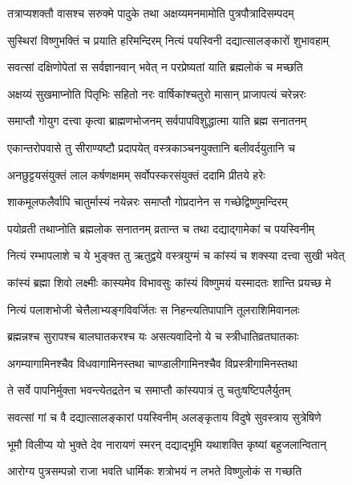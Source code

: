 \twolineshloka
{तत्राप्यशक्तौ वासश्च सरुक्मे पादुके तथा}
{अक्षय्यमनमामोति पुत्रपौत्रादिसम्पदम्} %

\twolineshloka
{सुस्थिरां विष्णुभक्तिं च प्रयाति हरिमन्दिरम्}
{नित्यं पयस्विनी दद्यात्सालङ्कारों शुभावहाम्} %

\twolineshloka
{सवत्सां दक्षिणोपेतां स सर्वज्ञानवान् भवेत्}
{न परप्रेष्यतां याति ब्रह्मलोकं च मच्छति} %

\twolineshloka
{अक्षय्यं सुखमाप्नोति पितृभिः सहितो नरः}
{वार्षिकांश्चतुरो मासान् प्राजापत्यं चरेन्नरः} %

\twolineshloka
{समाप्तौ गोयुग दत्त्वा कृत्वा ब्राह्मणभोजनम्}
{सर्वपापविशुद्धात्मा याति ब्रह्म सनातनम्} %

\twolineshloka
{एकान्तरोपवासे तु सीराण्यष्टौ प्रदापयेत्}
{वस्त्रकाञ्चनयुक्तानि बलीवर्दयुतानि च} %

\twolineshloka
{अनछुट्टयसंयुक्तं लाल कर्षणक्षमम्}
{सर्वोपस्करसंयुक्तं ददामि प्रीतये हरेः} %

\twolineshloka
{शाकमूलफलैर्वापि चातुर्मास्यं नयेन्नरः}
{समाप्तौ गोप्रदानेन स गच्छेद्विष्णुमन्दिरम्} %

\twolineshloka
{पयोव्रती तथाप्नोति ब्रह्मलोक सनातनम्}
{व्रतान्त च तथा दद्याद्गामेकां च पयस्विनीम्} %

\twolineshloka
{नित्यं रम्भापलाशे च ये भुङ्क्त तु ऋतुद्वये}
{वस्त्रयुग्मं च कांस्यं च शक्स्या दत्त्वा सुखी भवेत्} %

\twolineshloka
{कांस्यं ब्रह्मा शिवो लक्ष्मीः कास्यमेव विभावसुः}
{कांस्यं विष्णुमयं यस्मादतः शान्ति प्रयच्छ मे} %

\twolineshloka
{नित्यं पलाशभोजी चेत्तैलाभ्यङ्गविवर्जितः}
{स निहन्त्यतिपापानि तूलराशिमिवानलः} %

\twolineshloka
{ब्रह्मन्नश्च सुरापश्च बालघातकरश्च यः}
{असत्यवादिनो ये च स्त्रीधातिव्रतघातकाः} %

\twolineshloka
{अगम्यागामिनश्चैव विधवागामिनस्तथा}
{चाण्डालीगामिनश्चैव विप्रस्त्रीगामिनस्तथा} %

\twolineshloka
{ते सर्वे पापनिर्मुक्ता भवन्त्येतद्रतेन च}
{समाप्तौ कांस्यपात्रं तु चतुःषष्टिपलैर्युतम्} %

\twolineshloka
{सवत्सां गां च वै दद्यात्सालङ्कारां पयस्विनीम्}
{अलङ्कृताय विदुषे सुवस्त्राय सुत्रेषिणे} %

\twolineshloka
{भूमौ विलीप्य यो भुक्ते देव नारायणं स्मरन्}
{दद्याद्भूमि यथाशक्ति कृष्यां बहुजलान्वितान्} %

\twolineshloka
{आरोग्य पुत्रसम्पन्नो राजा भवति धार्मिकः}
{शत्रोभयं न लभते विष्णुलोकं स गच्छति} %

